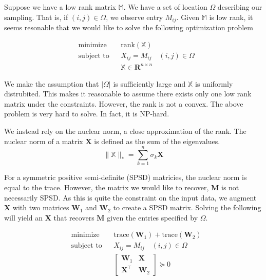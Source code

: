 \documentclass{article}
\begin{document}
Suppose we have a low rank matrix $\mathbb{M}$. We have a set of location $\Omega$ describing
our sampling. That is, if $(i,j) \in \Omega$, we observe entry $M_{ij}$. Given $\mathbb{M}$ is low rank, 
it seems resonable that we would like to solve the following optimization problem

\begin{equation*}
  \begin{aligned}
  & {\text{minimize}}
  & & \text{rank}(\mathbb{X}) \\[1pt]
  & \text{subject to}
  & & X_{ij} = M_{ij} \quad (i,j) \in \Omega\\[1pt]
  &&& \mathbb{X} \in \mathbf{R}^{n \times n}
  \end{aligned}
\end{equation*}

We make the assumption that $|\Omega|$ is sufficiently large and $\mathbb{X}$ is uniformly distrubited. 
This makes it reasonable to assume there exists only one low rank matrix under the constraints. 
However, the rank is not a convex. The above problem is very hard to solve. In fact, it is NP-hard. 

We instead rely on the nuclear norm, a close approximation of the rank. The nuclear norm of a matrix $\mathbf{X}$ is defined as the sum of 
the eigenvalues.
\[
\lVert \mathbb{X} \rVert_* = \sum_{k=1}^n \sigma_k {\mathbf{X}}  
\]

For a symmetric positive semi-definite (SPSD) matricies, the nuclear norm is equal to the trace. 
However, the matrix we would like to recover, $\mathbf{M}$ is not necessarily SPSD.
As this is quite the constraint on the input data, we augment $\mathbf{X}$ with two matrices 
$\mathbf{W}_1$ and $\mathbf{W}_2$ to create a SPSD matrix. Solving the following will yield an 
$\mathbf{X}$ that recovers $\mathbf{M}$ given the entries specified by $\Omega$.

\begin{equation*}
  \begin{aligned}
  & {\text{minimize}}
  & & \text{trace}(\mathbf{W}_1) + \text{trace}(\mathbf{W}_2) \\[1pt]
  & \text{subject to}
  & & X_{ij} = M_{ij} \quad (i,j) \in \Omega\\[1pt]
  &&& \begin{bmatrix} 
    \mathbf{W}_1 & \mathbf{X} \\
    \mathbf{X}^\top & \mathbf{W}_2
  \end{bmatrix} \succeq 0 
  \end{aligned}
\end{equation*}
\end{document}
